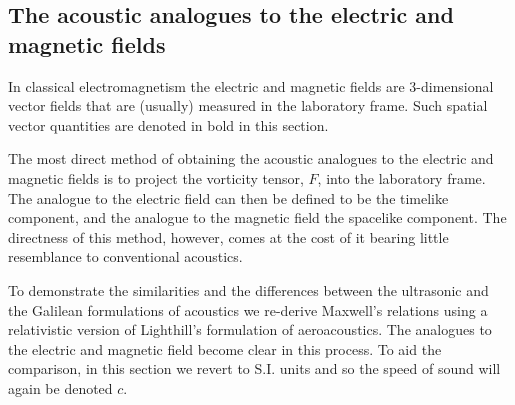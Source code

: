 \documentclass[10pt, fleqn,final,showtrims,oldfontcommands, article,a4paper,oneside]{memoir} %
\newcommand{\g}{\gamma_0}
\begin{document}





\subsection{The acoustic analogues to the electric and magnetic fields}\label{sec:int:EM}

In classical electromagnetism the electric and magnetic fields are 
3-dimensional vector fields that are (usually) measured  in the laboratory frame.
Such spatial vector quantities are denoted in bold in this section.

The most direct method of obtaining the acoustic analogues to the electric and magnetic fields
 is to project the vorticity tensor, $F$, into the laboratory  frame\cite{Hestenes2003, Doran2003}.
The analogue to the electric field can then be defined to be the timelike component, and the analogue to the magnetic field the spacelike component\cite{Hestenes2003}.
The directness of this method, however, comes at the cost of it bearing little  resemblance to conventional acoustics.

To demonstrate the similarities and the differences between  the ultrasonic and the Galilean  formulations of acoustics
we re-derive Maxwell's relations using a relativistic version of Lighthill's formulation of aeroacoustics\cite{Lighthill1952}.
The analogues to the electric and magnetic field  become clear in this process.
To aid the comparison, in this section we revert to S.I. units and so the speed of sound will again be denoted $c$.
\end{document}
